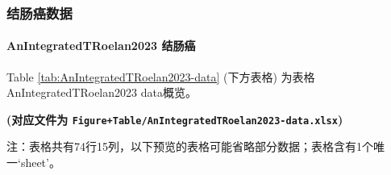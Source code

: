 \documentclass[
]{article}
\begin{document}
\hypertarget{ux7ed3ux80a0ux764cux6570ux636e}{%
\subsubsection{结肠癌数据}\label{ux7ed3ux80a0ux764cux6570ux636e}}

\hypertarget{main2}{%
\paragraph{AnIntegratedTRoelan2023 结肠癌}\label{main2}}

Table \ref{tab:AnIntegratedTRoelan2023-data} (下方表格) 为表格AnIntegratedTRoelan2023 data概览。

\textbf{(对应文件为 \texttt{Figure+Table/AnIntegratedTRoelan2023-data.xlsx})}

\begin{center}\begin{tcolorbox}[colback=gray!10, colframe=gray!50, width=0.9\linewidth, arc=1mm, boxrule=0.5pt]注：表格共有74行15列，以下预览的表格可能省略部分数据；表格含有1个唯一`sheet'。
\end{tcolorbox}
\end{center}
\end{document}

